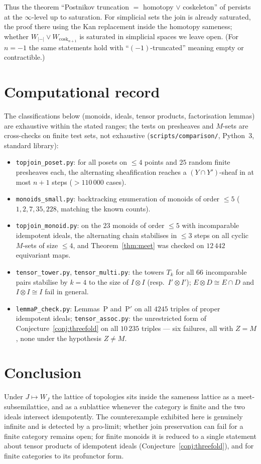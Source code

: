 \documentclass[11pt]{amsart}
\theoremstyle{definition}
\begin{document}
Thus the theorem ``Postnikov truncation $=$ homotopy $\vee$ coskeleton'' of
\cite{Postnikov} persists at the $\infty$-level up to saturation. For
simplicial sets the join is already saturated, the proof there using the Kan
replacement inside the homotopy sameness; whether
$W_{|-|}\vee W_{\mathrm{cosk}_{n+1}}$ is saturated in simplicial spaces we leave
open. (For $n=-1$ the same statements hold with ``$(-1)$-truncated'' meaning
empty or contractible.)

\section{Computational record}\label{sec:comp}
The classifications below (monoids, ideals, tensor products, factorisation
lemmas) are exhaustive within the stated ranges; the tests on presheaves and
$M$-sets are cross-checks on finite test sets, not exhaustive
(\texttt{scripts/comparison/}, Python~3, standard library):
\begin{itemize}
\item \texttt{topjoin\_poset.py}: for all posets on $\le4$ points and $25$ random
finite presheaves each, the alternating sheafification reaches a
$(Y\cap Y')$-sheaf in at most $n+1$ steps ($>110\,000$ cases).
\item \texttt{monoids\_small.py}: backtracking enumeration of monoids of order
$\le5$ ($1,2,7,35,228$, matching the known counts).
\item \texttt{topjoin\_monoid.py}: on the $23$ monoids of order $\le5$ with
incomparable idempotent ideals, the alternating chain stabilises in $\le3$
steps on all cyclic $M$-sets of size $\le4$, and Theorem~\ref{thm:meet} was
checked on $12\,442$ equivariant maps.
\item \texttt{tensor\_tower.py}, \texttt{tensor\_multi.py}: the towers $T_k$ for
all $66$ incomparable pairs stabilise by $k=4$ to the size of $I\otimes I$
(resp.\ $I'\otimes I'$); $E\otimes D\cong E\cap D$ and $I\otimes I\cong I$ fail
in general.
\item \texttt{lemmaP\_check.py}: Lemmas~P and~P$'$ on all $4245$ triples of
proper idempotent ideals; \texttt{tensor\_assoc.py}: the unrestricted form of
Conjecture~\ref{conj:threefold} on all $10\,235$ triples --- six failures, all
with $Z=M$, none under the hypothesis $Z\neq M$.
\end{itemize}

\section{Conclusion}
Under $J\mapsto W_J$ the lattice of topologies sits inside the sameness
lattice as a meet-subsemilattice, and as a sublattice whenever the category is
finite and the two ideals intersect idempotently. The counterexample
exhibited here is genuinely infinite and is detected by a pro-limit; whether
join preservation can fail for a finite category remains open; for finite
monoids it is reduced to a single statement about tensor products of
idempotent ideals (Conjecture~\ref{conj:threefold}), and for finite categories
to its profunctor form.
\end{document}
